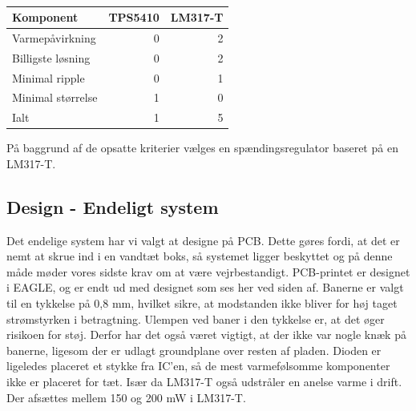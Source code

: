 \begin{table}[h]
  \centering
\begin{tabular}{lrr}
\hline
\textbf{Komponent} & \textbf{TPS5410} & \textbf{LM317-T} \\
\hline
Varmepåvirkning & 0 & 2 \\
\hline
Billigste løsning & 0 & 2 \\
\hline
Minimal ripple & 0 & 1 \\
\hline
Minimal størrelse & 1 & 0 \\
\hline
Ialt & 1 & 5 \\
\hline
\end{tabular}
  \caption{}
  \label{tab:komp3}
\end{table}

På baggrund af de opsatte kriterier vælges en spændingsregulator baseret på en LM317-T.

\clearpage
\subsection{Design - Endeligt system }
\label{sec:design-endel-syst}

Det endelige system har vi valgt at designe på PCB. Dette gøres fordi, at det er nemt at skrue ind i en vandtæt boks, så systemet ligger beskyttet og på denne måde møder vores sidste krav om at være vejrbestandigt. 
PCB-printet er designet i EAGLE, og er endt ud med designet som ses her ved siden af. Banerne er valgt til en tykkelse på 0,8 mm, hvilket sikre, at modstanden ikke bliver for høj taget strømstyrken i betragtning. Ulempen ved baner i den tykkelse er, at det øger risikoen for støj. Derfor har det også været vigtigt, at der ikke var nogle knæk på banerne, ligesom der er udlagt groundplane over resten af pladen. Dioden er ligeledes placeret et stykke fra IC’en, så de mest varmefølsomme komponenter ikke er placeret for tæt. Især da LM317-T også udstråler en anelse varme i drift. Der afsættes mellem 150 og 200 mW i LM317-T. 

